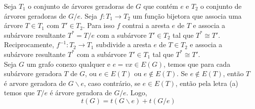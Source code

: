 
 Seja $T_1$ o conjunto de árvores geradoras de $G$ que contém $e$ e
$T_2$ o conjunto de árvores geradoras de $G/e$. Seja $f: T_1 \to T_2$ um função
bijetora  que associa uma árvore $T \in T_1$ com $T' \in T_2$. Para isso $f$
contrai a aresta $e$ de $T$ e associa a subárvore resultante $T^* = T/e$ com a
subárvore $T' \in T_2$ tal que $T^* \cong T'$. Reciprocamente, $f^{-1}: T_2 \to
T_1$ subdivide a aresta $e$ de $T \in T_2$ e associa a subárvore resultante
$T^*$ com a subárvore $T' \in T_1$ tal que $T^* \cong T'$.\\

 Seja $G$ um grafo conexo qualquer e $e = vx \in E(G)$, temos que para cada subárvore geradora $T$ de $G$, ou $e \in E(T)$ ou $e \notin E(T)$.
%
Se $e \notin E(T)$, então $T$ é arvore geradora de $G\backslash e$, caso contrário, se $e \in E(T)$, então pela letra (a) temos que $T/e$ é árvore geradora de $G/e$.
%
Logo, $$t(G) = t(G\backslash e) + t(G/e)$$
\fimprova

